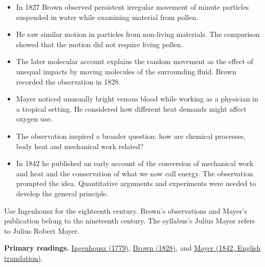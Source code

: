 \documentclass[12pt,a4paper]{article}
\begin{document}
\begin{tcolorbox}[examplebox, title={Robert Brown and irregular particle motion}]
\begin{itemize}[leftmargin=*, itemsep=3pt, topsep=4pt]
  \item In 1827 Brown observed persistent irregular movement of minute particles suspended in water while examining material from pollen.
  \item He saw similar motion in particles from non-living materials. The comparison showed that the motion did not require living pollen.
  \item The later molecular account explains the random movement as the effect of unequal impacts by moving molecules of the surrounding fluid. Brown recorded the observation in 1828.
\end{itemize}
\end{tcolorbox}

\begin{tcolorbox}[examplebox, title={Julius Robert Mayer and energy conservation}]
\begin{itemize}[leftmargin=*, itemsep=3pt, topsep=4pt]
  \item Mayer noticed unusually bright venous blood while working as a physician in a tropical setting. He considered how different heat demands might affect oxygen use.
  \item The observation inspired a broader question: how are chemical processes, body heat and mechanical work related?
  \item In 1842 he published an early account of the conversion of mechanical work and heat and the conservation of what we now call energy. The observation prompted the idea. Quantitative arguments and experiments were needed to develop the general principle.
\end{itemize}
\end{tcolorbox}

\begin{tcolorbox}[masonbox, title={Exam chronology}]
Use Ingenhousz for the eighteenth century. Brown's observations and Mayer's publication belong to the nineteenth century. The syllabus's Julius Mayor refers to Julius Robert Mayer.
\end{tcolorbox}

\textbf{Primary readings.} \href{https://www.biodiversitylibrary.org/item/127139}{Ingenhousz (1779)}, \href{https://www.rpgroup.caltech.edu/marseillePBoC2024/assets/pdfs/Brown1828.pdf}{Brown (1828)}, and \href{https://web.lemoyne.edu/Giunta/mayer.html}{Mayer (1842, English translation)}.
\end{document}

